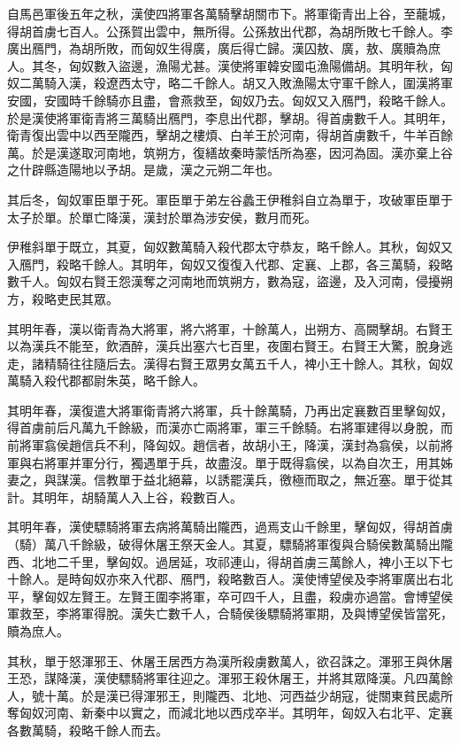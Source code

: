 \begin{pinyinscope}
自馬邑軍後五年之秋，漢使四將軍各萬騎擊胡關市下。將軍衛青出上谷，至蘢城，得胡首虜七百人。公孫賀出雲中，無所得。公孫敖出代郡，為胡所敗七千餘人。李廣出鴈門，為胡所敗，而匈奴生得廣，廣后得亡歸。漢囚敖、廣，敖、廣贖為庶人。其冬，匈奴數入盜邊，漁陽尤甚。漢使將軍韓安國屯漁陽備胡。其明年秋，匈奴二萬騎入漢，殺遼西太守，略二千餘人。胡又入敗漁陽太守軍千餘人，圍漢將軍安國，安國時千餘騎亦且盡，會燕救至，匈奴乃去。匈奴又入鴈門，殺略千餘人。於是漢使將軍衛青將三萬騎出鴈門，李息出代郡，擊胡。得首虜數千人。其明年，衛青復出雲中以西至隴西，擊胡之樓煩、白羊王於河南，得胡首虜數千，牛羊百餘萬。於是漢遂取河南地，筑朔方，復繕故秦時蒙恬所為塞，因河為固。漢亦棄上谷之什辟縣造陽地以予胡。是歲，漢之元朔二年也。

其后冬，匈奴軍臣單于死。軍臣單于弟左谷蠡王伊稚斜自立為單于，攻破軍臣單于太子於單。於單亡降漢，漢封於單為涉安侯，數月而死。

伊稚斜單于既立，其夏，匈奴數萬騎入殺代郡太守恭友，略千餘人。其秋，匈奴又入鴈門，殺略千餘人。其明年，匈奴又復復入代郡、定襄、上郡，各三萬騎，殺略數千人。匈奴右賢王怨漢奪之河南地而筑朔方，數為寇，盜邊，及入河南，侵擾朔方，殺略吏民其眾。

其明年春，漢以衛青為大將軍，將六將軍，十餘萬人，出朔方、高闕擊胡。右賢王以為漢兵不能至，飲酒醉，漢兵出塞六七百里，夜圍右賢王。右賢王大驚，脫身逃走，諸精騎往往隨后去。漢得右賢王眾男女萬五千人，裨小王十餘人。其秋，匈奴萬騎入殺代郡都尉朱英，略千餘人。

其明年春，漢復遣大將軍衛青將六將軍，兵十餘萬騎，乃再出定襄數百里擊匈奴，得首虜前后凡萬九千餘級，而漢亦亡兩將軍，軍三千餘騎。右將軍建得以身脫，而前將軍翕侯趙信兵不利，降匈奴。趙信者，故胡小王，降漢，漢封為翕侯，以前將軍與右將軍并軍分行，獨遇單于兵，故盡沒。單于既得翕侯，以為自次王，用其姊妻之，與謀漢。信教單于益北絕幕，以誘罷漢兵，徼極而取之，無近塞。單于從其計。其明年，胡騎萬人入上谷，殺數百人。

其明年春，漢使驃騎將軍去病將萬騎出隴西，過焉支山千餘里，擊匈奴，得胡首虜（騎）萬八千餘級，破得休屠王祭天金人。其夏，驃騎將軍復與合騎侯數萬騎出隴西、北地二千里，擊匈奴。過居延，攻祁連山，得胡首虜三萬餘人，裨小王以下七十餘人。是時匈奴亦來入代郡、鴈門，殺略數百人。漢使博望侯及李將軍廣出右北平，擊匈奴左賢王。左賢王圍李將軍，卒可四千人，且盡，殺虜亦過當。會博望侯軍救至，李將軍得脫。漢失亡數千人，合騎侯後驃騎將軍期，及與博望侯皆當死，贖為庶人。

其秋，單于怒渾邪王、休屠王居西方為漢所殺虜數萬人，欲召誅之。渾邪王與休屠王恐，謀降漢，漢使驃騎將軍往迎之。渾邪王殺休屠王，并將其眾降漢。凡四萬餘人，號十萬。於是漢已得渾邪王，則隴西、北地、河西益少胡寇，徙關東貧民處所奪匈奴河南、新秦中以實之，而減北地以西戍卒半。其明年，匈奴入右北平、定襄各數萬騎，殺略千餘人而去。


\end{pinyinscope}
